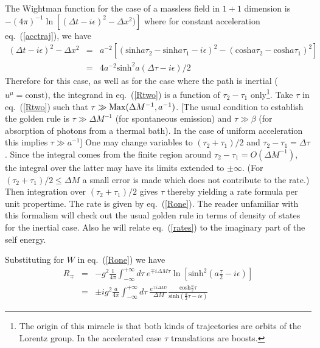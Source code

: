 \documentclass[12pt,oneside]{report}
\begin{document}
  The Wightman function for the
case of a massless field in $1+1$ dimension is $-(4\pi)^{-1} \ln
\left[(\Delta t-i\epsilon)^2 - \Delta x^2) \right]$ where for constant
acceleration eq.~(\ref{acctraj}), we have
\begin{eqnarray} (\Delta
t-i\epsilon)^2 - \Delta x^2 & = &
a^{-2} \left[ \left(\mbox{sinh} a\tau_2 - \mbox{sinh}a \tau_1  
- i\epsilon\right)^2 -
\left(\mbox{cosh} a\tau_2 - \mbox{cosh} a \tau_1\right)^2 \right]
\nonumber \\ & = & 
4a^{-2}
\mbox{sinh}^2 a (\Delta\tau - i \epsilon)/2 \label{Rthree} \end{eqnarray}
Therefore for this case, as well as for the case where the
path is inertial ($u^\mu = \mbox{const})$, the
integrand in eq.~(\ref{Rtwo}) is a function of $\tau_2 - \tau_1$
only\footnote{\label{pgftnote1} The origin of
this miracle is that both kinds of trajectories are orbits of the Lorentz
group. 
In the accelerated case $\tau$ translations are boosts.}.  Take $\tau$
in eq.~(\ref{Rtwo}) such that $\tau \gg   {\rm Max} (\Delta M^{-1},a^{-1})$.
[The  usual condition to establish the golden rule is $\tau \gg  \Delta M
^{-1}$ (for spontaneous emission) and $\tau \gg  \beta$ (for absorption of
photons from a thermal bath). In the case of uniform acceleration this
implies  $ \tau \gg  a^{-1}$]
 One may change
variables to $(\tau_2 + \tau_1)/2$ and $\tau_2 - \tau_1 = \Delta \tau$. 
Since the integral comes from the finite region around $\tau_2 - \tau_1 =
O(\Delta M^{-1})$, the integral over the latter may  have its limits extended
to $\pm \infty $. (For $(\tau_2 + \tau_1)/2 \leq \Delta M$  a
small error is made which does not contribute to the rate.) Then 
integration over
$(\tau_2 + \tau_1)/2$ gives $\tau$ thereby yielding a rate formula per unit
propertime. The rate is given by eq.~(\ref{Rone}).  The  reader unfamiliar
with this formalism will check out the usual golden rule in terms of density  of
states for the inertial case.  Also he will relate eq.~(\ref{rates}) to the
imaginary part of the self energy. \par Substituting for $W$ in eq.~(\ref{Rone})
we have \begin{eqnarray} R_{\mp} & = & -g^2 \frac{1}{4\pi}
\int^{+\infty}_{-\infty}\! d\tau \  e^{\mp i \Delta M\tau} \ln
\left[\mbox{sinh}^2 \left(a \frac{\tau}{2} - i \epsilon \right) \right]
\nonumber \\ &=& \pm ig^2 \frac{a}{4\pi}  \int^{+ \infty}_{- \infty} \! d\tau \ 
\frac{e^{\mp i \Delta M \tau}}{\Delta M} \frac{\mbox{cosh} \frac{a}{2}
\tau}{\mbox{sinh} \left( \frac{a}{2} \tau - i \epsilon \right)} \label{Rfour}
\end{eqnarray}
\end{document}
